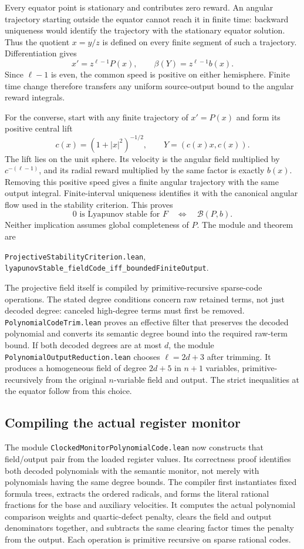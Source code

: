 \documentclass[11pt]{article}
\newcommand{\code}[1]{{\small\nolinkurl{#1}}}
\begin{document}
Every equator point is stationary and contributes zero reward. An angular
trajectory starting outside the equator cannot reach it in finite time:
backward uniqueness would identify the trajectory with the stationary
equator solution. Thus the quotient $x=y/z$ is defined on every finite
segment of such a trajectory. Differentiation gives
\[
 x'=z^{\ell-1}P(x),\qquad \beta(Y)=z^{\ell-1}b(x).
\]
Since $\ell-1$ is even, the common speed is positive on either hemisphere.
Finite time change therefore transfers any uniform source-output bound
to the angular reward integrals.

For the converse, start with any finite trajectory of $x'=P(x)$ and
form its positive central lift
\[
 c(x)=(1+|x|^2)^{-1/2},\qquad Y=(c(x)x,c(x)).
\]
The lift lies on the unit sphere. Its velocity is the angular field
multiplied by $c^{-(\ell-1)}$, and its radial reward multiplied by the
same factor is exactly $b(x)$. Removing this positive speed gives a
finite angular trajectory with the same output integral. Finite-interval
uniqueness identifies it with the canonical angular flow used in the
stability criterion. This proves
\[
 \text{$0$ is Lyapunov stable for $F$}
 \quad\Longleftrightarrow\quad \mathcal B(P,b).
\]
Neither implication assumes global completeness of $P$.
The module and theorem are
\begin{center}
\code{ProjectiveStabilityCriterion.lean},\\
\code{lyapunovStable_fieldCode_iff_boundedFiniteOutput}.
\end{center}

The projective field itself is compiled by primitive-recursive sparse-code
operations. The stated degree conditions concern raw retained terms,
not just decoded degree: canceled high-degree terms must first be removed.
\code{PolynomialCodeTrim.lean} proves an effective filter that preserves
the decoded polynomial and converts its semantic degree bound into the
required raw-term bound. If both decoded degrees are at most $d$, the
module \code{PolynomialOutputReduction.lean} chooses $\ell=2d+3$ after
trimming. It produces a homogeneous field of degree $2d+5$ in $n+1$
variables, primitive-recursively from the original $n$-variable field and
output. The strict inequalities at the equator follow from this choice.
\subsection{Compiling the actual register monitor}

The module \code{ClockedMonitorPolynomialCode.lean} now constructs that
field/output pair from the loaded register values. Its correctness proof
identifies both decoded polynomials with the semantic monitor, not merely
with polynomials having the same degree bounds. The compiler first
instantiates fixed formula trees, extracts the ordered radicals, and
forms the literal rational fractions for the base and auxiliary
velocities. It computes the actual polynomial comparison weights and
quartic-defect penalty, clears the field and output denominators together,
and subtracts the same clearing factor times the penalty from the output.
Each operation is primitive recursive on sparse rational codes.
\end{document}
